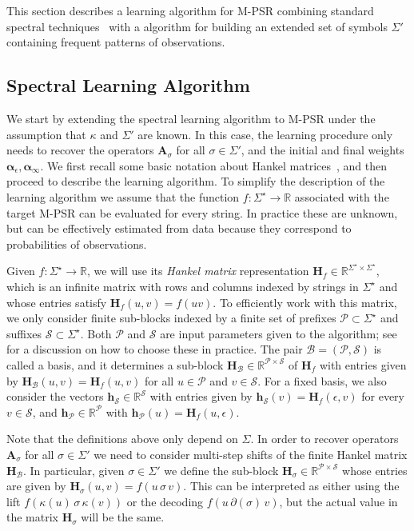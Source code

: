 \documentclass[letterpaper]{article}
\newcommand{\mat}[1]{\mathbf{#1}}
\newcommand{\A}{\mat{A}}
\renewcommand{\H}{\mat{H}}
\newcommand{\Rset}{\mathbb{R}}
\newcommand{\R}{\Rset}
\newcommand{\sstar}{\Sigma^\star}
\newcommand{\aone}{\boldsymbol{\alpha}_\epsilon}
\newcommand{\ainf}{\boldsymbol{\alpha}_{\infty}}
\newcommand{\Bs}{\mathcal{B}}
\newcommand{\Ps}{\mathcal{P}}
\newcommand{\Ss}{\mathcal{S}}
\begin{document}
This section describes a learning algorithm for M-PSR combining standard spectral techniques~\cite{bootspsr} with a algorithm for building an extended set of symbols $\Sigma'$ containing frequent patterns of observations.

\subsection{Spectral Learning Algorithm}

We start by extending the spectral learning algorithm to M-PSR under the assumption that $\kappa$ and $\Sigma'$ are known. In this case, the learning procedure only needs to recover the operators $\A_\sigma$ for all $\sigma \in \Sigma'$, and the initial and final weights $\aone, \ainf$. We first recall some basic notation about Hankel matrices~\cite{CarlylePaz71,Fliess74}, and then proceed to describe the learning algorithm. To simplify the description of the learning algorithm we assume that the function $f : \sstar \to \R$ associated with the target M-PSR can be evaluated for every string. In practice these are unknown, but can be effectively estimated from data because they correspond to probabilities of observations. 

Given $f : \sstar \to \R$, we will use its \emph{Hankel matrix} representation $\H_f \in \R^{\sstar \times \sstar}$, which is an infinite matrix with rows and columns indexed by strings in $\sstar$ and whose entries satisfy $\H_f(u,v) = f(u v)$. To efficiently work with this matrix, we only consider finite sub-blocks indexed by a finite set of prefixes $\Ps \subset \sstar$ and suffixes $\Ss \subset \sstar$. Both $\Ps$ and $\Ss$ are input parameters given to the algorithm; see \cite{icml12} for a discussion on how to choose these in practice. The pair $\Bs = (\Ps,\Ss)$ is called a basis, and it determines a sub-block $\H_\Bs \in \R^{\Ps \times \Ss}$ of $\H_f$ with entries given by $\H_\Bs(u,v) = \H_f(u,v)$ for all $u \in \Ps$ and $v \in \Ss$. For a fixed basis, we also consider the vectors $\mat{h}_{\Ss} \in \R^{\Ss}$ with entries given by $\mat{h}_{\Ss}(v) = \H_f(\epsilon,v)$ for every $v \in \Ss$, and $\mat{h}_{\Ps} \in \R^{\Ps}$ with $\mat{h}_{\Ps}(u) = \H_f(u,\epsilon)$.

Note that the definitions above only depend on $\Sigma$. In order to recover operators $\A_\sigma$ for all $\sigma \in \Sigma'$ we need to consider multi-step shifts of the finite Hankel matrix $\H_{\Bs}$. In particular, given $\sigma \in \Sigma'$ we define the sub-block $\H_\sigma \in \R^{\Ps \times \Ss}$ whose entries are given by $\H_\sigma(u,v) = f(u \, \sigma \, v)$. This can be interpreted as either using the lift $f(\kappa(u) \, \sigma \, \kappa(v))$ or the decoding $f(u \, \partial(\sigma) \, v)$, but the actual value in the matrix $\H_\sigma$ will be the same.
\end{document}
